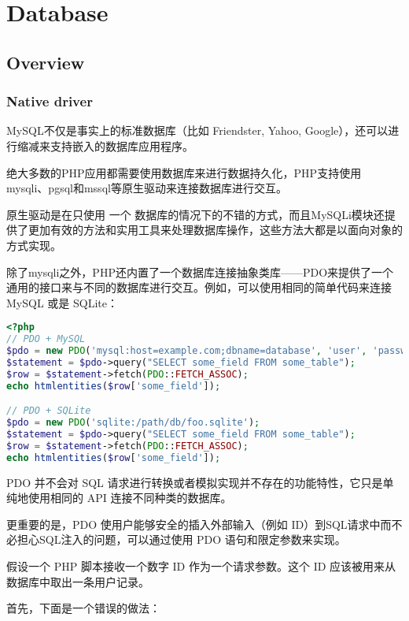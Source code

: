 \part{Database}



\chapter{Overview}




\section{Native driver}


MySQL不仅是事实上的标准数据库（比如 Friendster, Yahoo, Google），还可以进行缩减来支持嵌入的数据库应用程序。

绝大多数的PHP应用都需要使用数据库来进行数据持久化，PHP支持使用mysqli、pgsql和mssql等原生驱动来连接数据库进行交互。

原生驱动是在只使用 一个 数据库的情况下的不错的方式，而且MySQLi模块还提供了更加有效的方法和实用工具来处理数据库操作，这些方法大都是以面向对象的方式实现。

除了mysqli之外，PHP还内置了一个数据库连接抽象类库——PDO来提供了一个通用的接口来与不同的数据库进行交互。例如，可以使用相同的简单代码来连接 MySQL 或是 SQLite：

\begin{lstlisting}[language=PHP]
<?php
// PDO + MySQL
$pdo = new PDO('mysql:host=example.com;dbname=database', 'user', 'password');
$statement = $pdo->query("SELECT some_field FROM some_table");
$row = $statement->fetch(PDO::FETCH_ASSOC);
echo htmlentities($row['some_field']);

// PDO + SQLite
$pdo = new PDO('sqlite:/path/db/foo.sqlite');
$statement = $pdo->query("SELECT some_field FROM some_table");
$row = $statement->fetch(PDO::FETCH_ASSOC);
echo htmlentities($row['some_field']);
\end{lstlisting}

PDO 并不会对 SQL 请求进行转换或者模拟实现并不存在的功能特性，它只是单纯地使用相同的 API 连接不同种类的数据库。

更重要的是，PDO 使用户能够安全的插入外部输入（例如 ID）到SQL请求中而不必担心SQL注入的问题，可以通过使用 PDO 语句和限定参数来实现。

假设一个 PHP 脚本接收一个数字 ID 作为一个请求参数。这个 ID 应该被用来从数据库中取出一条用户记录。

首先，下面是一个错误的做法：

